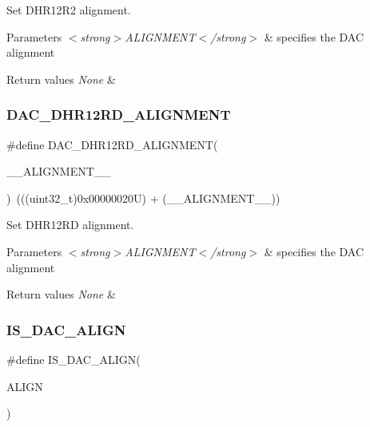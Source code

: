 Set D\+H\+R12\+R2 alignment. 


\begin{DoxyParams}{Parameters}
{\em $<$strong$>$\+A\+L\+I\+G\+N\+M\+E\+N\+T$<$/strong$>$} & specifies the D\+AC alignment \\
\hline
\end{DoxyParams}

\begin{DoxyRetVals}{Return values}
{\em None} & \\
\hline
\end{DoxyRetVals}
\mbox{\label{group___d_a_c___private___macros_ga3d35c7e3872d5b79f83a7efdfe3df5f0}} 
\subsubsection{\texorpdfstring{DAC\_DHR12RD\_ALIGNMENT}{DAC\_DHR12RD\_ALIGNMENT}}
{\footnotesize\ttfamily \#define D\+A\+C\+\_\+\+D\+H\+R12\+R\+D\+\_\+\+A\+L\+I\+G\+N\+M\+E\+NT(\begin{DoxyParamCaption}\item[{}]{\+\_\+\+\_\+\+A\+L\+I\+G\+N\+M\+E\+N\+T\+\_\+\+\_\+ }\end{DoxyParamCaption})~(((uint32\+\_\+t)0x00000020\+U) + (\+\_\+\+\_\+\+A\+L\+I\+G\+N\+M\+E\+N\+T\+\_\+\+\_\+))}



Set D\+H\+R12\+RD alignment. 


\begin{DoxyParams}{Parameters}
{\em $<$strong$>$\+A\+L\+I\+G\+N\+M\+E\+N\+T$<$/strong$>$} & specifies the D\+AC alignment \\
\hline
\end{DoxyParams}

\begin{DoxyRetVals}{Return values}
{\em None} & \\
\hline
\end{DoxyRetVals}
\mbox{\label{group___d_a_c___private___macros_ga7779c36606827a6a2c4423414a441bde}} 
\subsubsection{\texorpdfstring{IS\_DAC\_ALIGN}{IS\_DAC\_ALIGN}}
{\footnotesize\ttfamily \#define I\+S\+\_\+\+D\+A\+C\+\_\+\+A\+L\+I\+GN(\begin{DoxyParamCaption}\item[{}]{A\+L\+I\+GN }\end{DoxyParamCaption})}

